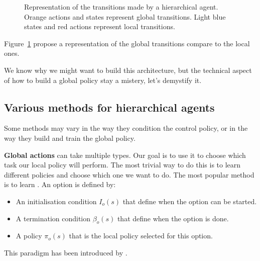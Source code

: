 \begin{figure}
    \caption{Representation of the transitions made by a hierarchical agent. Orange actions and states represent global
    transitions. Light blue states and red actions represent local transitions.}
    \label{figure:bg:plan-rl:hierarchical-transitions}
\end{figure}


Figure~\ref{figure:bg:plan-rl:hierarchical-transitions} propose a representation of the global transitions compare to
the local ones.

We know why we might want to build this architecture, but the technical aspect of how to build a global policy stay a
mistery, let's demystify it.

\subsection{Various methods for hierarchical agents}\label{subsection:bg:plan-rl:global-actions}

Some methods may vary in the way they condition the control policy, or in the way they build and train the global
policy.

\textbf{Global actions} can take multiple types.
Our goal is to use it to choose which task our local policy will perform.
The most trivial way to do this is to learn different policies and choose which one we want to do.
The most popular method is to learn .
An option is defined by:
\begin{itemize}
    \item An initialisation condition $I_o(s)$ that define when the option can be started.
    \item A termination condition $\beta_o(s)$ that define when the option is done.
    \item A policy $\pi_o(s)$ that is the local policy selected for this option.
\end{itemize}
This paradigm has been introduced by \citet{sutton1999between}.

